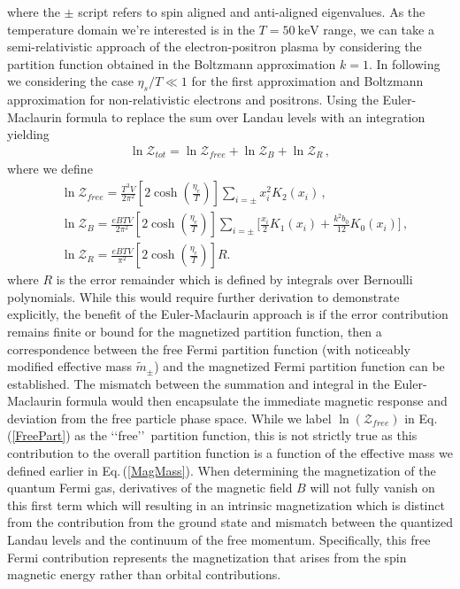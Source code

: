 \documentclass[universe,article,submit,moreauthors,pdftex,a4paper]{Definitions/mdpi}
\newcommand{\req}[1]{Eq.\,(\ref{#1})}
\begin{document}
where the $\pm$ script refers to spin aligned and anti-aligned eigenvalues. As the temperature domain we're interested is in the $T=50\ \mathrm{keV}$ range, we can take a semi-relativistic approach of the electron-positron plasma by considering the partition function obtained in the Boltzmann approximation $k=1$. In following we considering the case $\eta_s/T\ll1$ for the first approximation and Boltzmann approximation for non-relativistic electrons and positrons. Using the Euler-Maclaurin formula to replace the sum over Landau levels with an integration yielding
\begin{align}
  \ln\mathcal{Z}_{tot}=\ln\mathcal{Z}_{free}+\ln\mathcal{Z}_B+\ln\mathcal{Z}_R\,,
\end{align}
where we define 
\begin{align}
  \label{FreePart}&\ln\mathcal{Z}_{free}=\frac{T^3V}{2\pi^2}\left[2\cosh{\left(\frac{\eta_{e}}{T}\right)}\right]\sum_{i=\pm}x_i^2K_2\left(x_i\right)\,,\\
  \label{MagPart}&\ln\mathcal{Z}_B=\frac{eBTV}{2\pi^2}\left[2\cosh{\left(\frac{\eta_{e}}{T}\right)}\right]\sum_{i=\pm}\bigg[\frac{x_i}{2}K_1\left(x_i\right)+\frac{k^2b_0}{12}K_0\left(x_i\right)\bigg]\,,\\
  \label{ErrorPart}&\ln\mathcal{Z}_R=\frac{eBTV}{\pi^2}\left[2\cosh{\left(\frac{\eta_{e}}{T}\right)}\right]R.
\end{align}
where $R$ is the error remainder which is defined by integrals over Bernoulli polynomials.
While this would require further derivation to demonstrate explicitly, the benefit of the Euler-Maclaurin approach is if the error contribution remains finite or bound for the magnetized partition function, then a correspondence between the free Fermi partition function (with noticeably modified effective mass $\tilde{m}_{\pm}$) and the magnetized Fermi partition function can be established. The mismatch between the summation and integral in the Euler-Maclaurin formula would then encapsulate the immediate magnetic response and deviation from the free particle phase space. While we label $\ln(\mathcal{Z}_{free})$ in \req{FreePart} as the \lq\lq free\rq\rq\ partition function, this is not strictly true as this contribution to the overall partition function is a function of the effective mass we defined earlier in \req{MagMass}. When determining the magnetization of the quantum Fermi gas, derivatives of the magnetic field $B$ will not fully vanish on this first term which will resulting in an intrinsic magnetization which is distinct from the contribution from the ground state and mismatch between the quantized Landau levels and the continuum of the free momentum. Specifically, this free Fermi contribution represents the magnetization that arises from the spin magnetic energy rather than orbital contributions.
\end{document}
